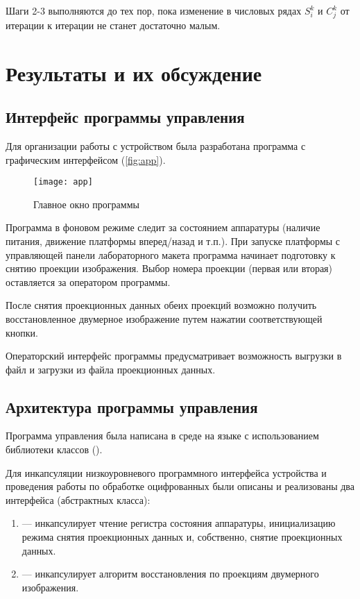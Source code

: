 Шаги 2-3 выполняются до тех пор, пока изменение в числовых рядах $S^k_i$ и $C^k_j$ от итерации к итерации не станет достаточно малым.

\section{Результаты и их обсуждение}

\subsection{Интерфейс программы управления}

Для организации работы с устройством была разработана программа с графическим интерфейсом (\autoref{fig:app}).

\begin{figure}[h]%
\centering
\texttt{[image: app]}%
\caption[]{Главное окно программы}%
\label{fig:app}%
\end{figure}

Программа в фоновом режиме следит за состоянием аппаратуры (наличие питания, движение платформы вперед/назад и т.п.). При запуске платформы с управляющей панели лабораторного макета программа начинает подготовку к снятию проекции изображения. Выбор номера проекции (первая или вторая) оставляется за оператором программы.

После снятия проекционных данных обеих проекций возможно получить восстановленное двумерное изображение путем нажатии соответствующей кнопки.

Операторский интерфейс программы предусматривает возможность выгрузки в файл и загрузки из файла проекционных данных.

\subsection{Архитектура программы управления}

Программа управления была написана в среде  на языке  с использованием библиотеки классов  ().

Для инкапсуляции низкоуровневого программного интерфейса устройства и проведения работы по обработке оцифрованных были описаны и реализованы два интерфейса (абстрактных класса):
%
\begin{enumerate}
	\item {} --- инкапсулирует чтение регистра состояния аппаратуры, инициализацию режима снятия проекционных данных и, собственно, снятие проекционных данных.
	\item {} --- инкапсулирует алгоритм восстановления по проекциям двумерного изображения.
\end{enumerate}

